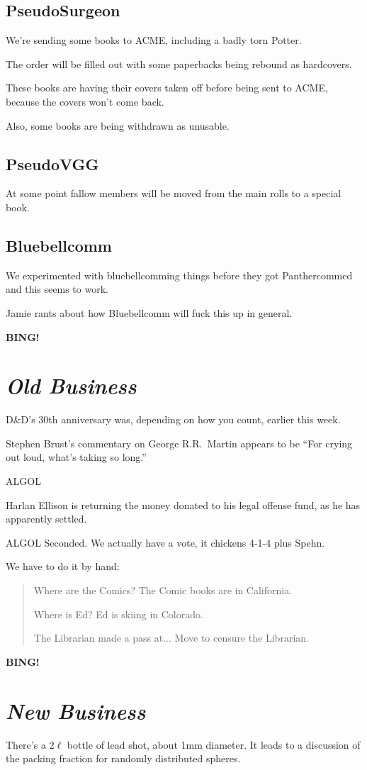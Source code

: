 \documentclass[10pt]{article}
\newcommand{\bing}{{\bf BING!} }
\newcommand{\goto}[1]{\bing \vskip 12pt \section*{{\em{#1}}}}
\newcommand{\ps}{ plus Spehn\xspace}
\begin{document}
\subsection*{PseudoSurgeon}
We're sending some books to ACME, including a badly torn Potter.

The order will be filled out with some paperbacks being rebound as
hardcovers.

These books are having their covers taken off before being sent to
ACME, because the covers won't come back.

Also, some books are being withdrawn as unusable.

\subsection*{PseudoVGG}
At some point fallow members will be moved from the main rolls to a
special book.

\subsection*{Bluebellcomm}
We experimented with bluebellcomming things before they got
Panthercommed and this seems to work.

Jamie rants about how Bluebellcomm will fuck this up in general.

\goto{Old Business}

D\&D's 30th anniversary was, depending on how you count, earlier this
week.

Stephen Brust's commentary on George R.R.~Martin appears to be ``For
crying out loud, what's taking so long.''

ALGOL

Harlan Ellison is returning the money donated to his legal offense
fund, as he has apparently settled.

ALGOL Seconded.  We actually have a vote, it chickens 4-1-4\ps.

We have to do it by hand:
\begin{quotation}
Where are the Comics?  The Comic books are in California.

Where is Ed?  Ed is skiing in Colorado.

The Librarian made a pass at... Move to censure the Librarian.
\end{quotation}

\goto{New Business}

There's a $2\ell$ bottle of lead shot, about 1mm diameter.  It leads
to a discussion of the packing fraction for randomly distributed
spheres.
\end{document}
